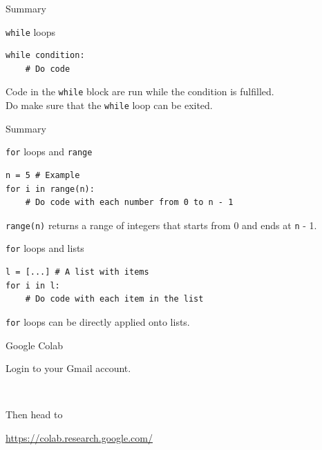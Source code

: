 \documentclass[dvipsnames, svgnames, x11names]{beamer}
\begin{document}
\begin{frame}[fragile]{Summary}
\begin{block}{\texttt{while} loops}
\begin{verbatim}
while condition:
    # Do code
\end{verbatim}
Code in the \texttt{while} block are run while the condition is fulfilled.\\
Do make sure that the \texttt{while} loop can be exited.
\end{block}
\end{frame}

\begin{frame}[fragile]{Summary}
\begin{block}{\texttt{for} loops and \texttt{range}}
\begin{verbatim}
n = 5 # Example
for i in range(n):
    # Do code with each number from 0 to n - 1
\end{verbatim}
\texttt{range(n)} returns a range of integers that starts from 0 and ends at \texttt{n} - 1.
\end{block}

\begin{block}{\texttt{for} loops and lists}
\begin{verbatim}
l = [...] # A list with items
for i in l:
    # Do code with each item in the list
\end{verbatim}
\texttt{for} loops can be directly applied onto lists.
\end{block}
\end{frame}

\begin{frame}[fragile]{Google Colab}
    \begin{center}
        Login to your Gmail account.

        \

        Then head to

        \href{https://colab.research.google.com/}{https://colab.research.google.com/}
    \end{center}
\end{frame}
\end{document}
